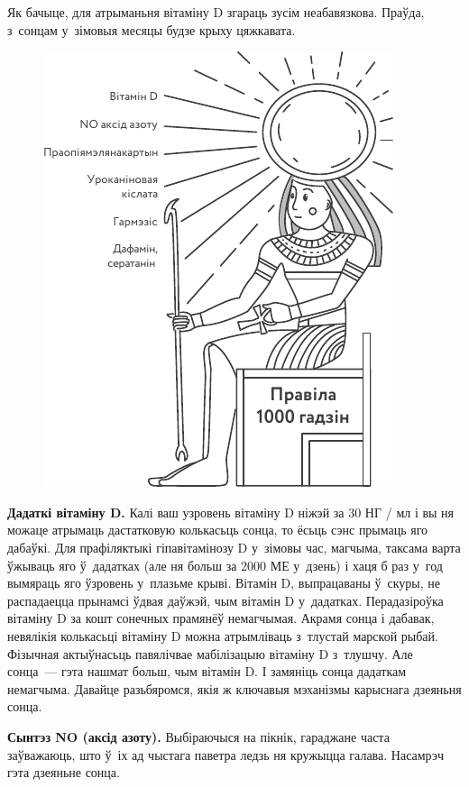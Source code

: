 Як бачыце, для атрыманьня вітаміну D згараць зусім неабавязкова. Праўда, з~сонцам у~зімовыя месяцы будзе крыху цяжкавата.

\begin{figure}[htb!]
  \centering
  \includegraphics[scale=1.2]{willpower/ch12/2.pdf}
\end{figure}

\textbf{Дадаткі вітаміну D.} Калі ваш узровень вітаміну D ніжэй за 30 НГ / мл і вы ня можаце атрымаць дастатковую колькасьць сонца, то ёсьць сэнс прымаць яго дабаўкі. Для прафіляктыкі гіпавітамінозу D у~зімовы час, магчыма, таксама варта ўжываць яго ў~дадатках (але ня больш за 2000 МЕ у~дзень) і хаця б раз у~год вымяраць яго ўзровень у~плазьме крыві. Вітамін D, выпрацаваны ў~скуры, не распадаецца прынамсі ўдвая даўжэй, чым вітамін D у~дадатках. Перадазіроўка вітаміну D за кошт сонечных прамянёў немагчымая. Акрамя сонца і дабавак, невялікія колькасьці вітаміну D можна атрымліваць з~тлустай марской рыбай. Фізычная актыўнасьць павялічвае мабілізацыю вітаміну D з~тлушчу. Але сонца~--- гэта нашмат больш, чым вітамін D. І замяніць сонца дадаткам немагчыма. Давайце разьбяромся, якія ж ключавыя мэханізмы карыснага дзеяньня сонца.

\textbf{Сынтэз NO (аксід азоту).} Выбіраючыся на пікнік, гараджане часта заўважаюць, што ў~іх ад чыстага паветра ледзь ня кружыцца галава. Насамрэч гэта дзеяньне сонца.

